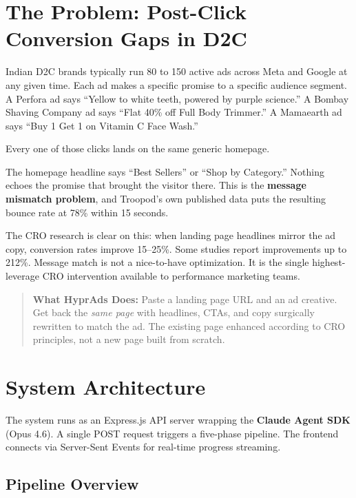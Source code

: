 \documentclass{article}
\begin{document}
\section{The Problem: Post-Click Conversion Gaps in D2C}

Indian D2C brands typically run 80 to 150 active ads across Meta and Google at any given time. Each ad makes a specific promise to a specific audience segment. A Perfora ad says ``Yellow to white teeth, powered by purple science.'' A Bombay Shaving Company ad says ``Flat 40\% off Full Body Trimmer.'' A Mamaearth ad says ``Buy 1 Get 1 on Vitamin C Face Wash.''

Every one of those clicks lands on the same generic homepage.

The homepage headline says ``Best Sellers'' or ``Shop by Category.'' Nothing echoes the promise that brought the visitor there. This is the \textbf{message mismatch problem}, and Troopod's own published data puts the resulting bounce rate at 78\% within 15 seconds.

The CRO research is clear on this: when landing page headlines mirror the ad copy, conversion rates improve 15--25\%. Some studies report improvements up to 212\%. Message match is not a nice-to-have optimization. It is the single highest-leverage CRO intervention available to performance marketing teams.

\begin{quote}
\textbf{\textcolor{accent}{What HyprAds Does:}} Paste a landing page URL and an ad creative. Get back the \textit{same page} with headlines, CTAs, and copy surgically rewritten to match the ad. The existing page enhanced according to CRO principles, not a new page built from scratch.
\end{quote}

\section{System Architecture}

The system runs as an Express.js API server wrapping the \textbf{Claude Agent SDK} (Opus 4.6). A single POST request triggers a five-phase pipeline. The frontend connects via Server-Sent Events for real-time progress streaming.

\subsection{Pipeline Overview}
\end{document}
